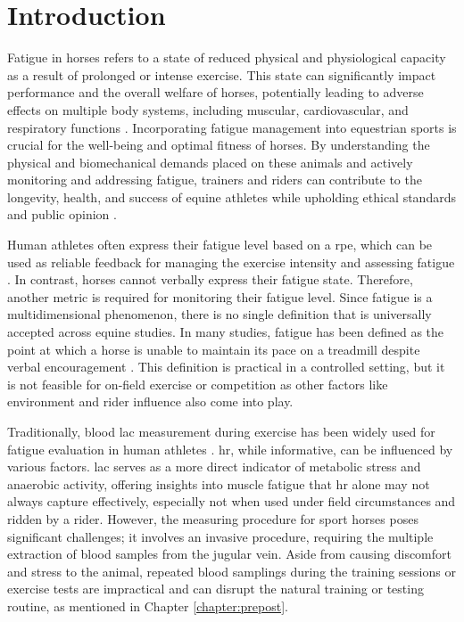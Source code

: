 \section{Introduction}
\label{sec:fatigue_introduction}

Fatigue in horses refers to a state of reduced physical and physiological capacity as a result of prolonged or intense exercise. This state can significantly impact performance and the overall welfare of horses, potentially leading to adverse effects on multiple body systems, including muscular, cardiovascular, and respiratory functions \cite{Taylor2008-mp}. Incorporating fatigue management into equestrian sports is crucial for the well-being and optimal fitness of horses. By understanding the physical and biomechanical demands placed on these animals and actively monitoring and addressing fatigue, trainers and riders can contribute to the longevity, health, and success of equine athletes while upholding ethical standards and public opinion \cite{Arfuso2021PeripheralHorses,Rivero2001CoordinatedTraining.}. 

Human athletes often express their fatigue level based on a \gls{rpe}, which can be used as reliable feedback for managing the exercise intensity and assessing fatigue \cite{carrie}. In contrast, horses cannot verbally express their fatigue state. Therefore, another metric is required for monitoring their fatigue level. Since fatigue is a multidimensional phenomenon, there is no single definition that is universally accepted across equine studies. In many studies, fatigue has been defined as the point at which a horse is unable to maintain its pace on a treadmill despite verbal encouragement \cite{Bowers1999InfluenceRacehorses.}. This definition is practical in a controlled setting, but it is not feasible for on-field exercise or competition as other factors like environment and rider influence also come into play.

Traditionally, blood \gls{lac} measurement during exercise has been widely used for fatigue evaluation in human athletes \cite{Theofilidis2018-yz,Ishii2013-mp}. \gls{hr}, while informative, can be influenced by various factors. \gls{lac} serves as a more direct indicator of metabolic stress and anaerobic activity, offering insights into muscle fatigue that \gls{hr} alone may not always capture effectively, especially not when used under field circumstances and ridden by a rider. However, the measuring procedure for sport horses poses significant challenges; it involves an invasive procedure, requiring the multiple extraction of blood samples from the jugular vein. Aside from causing discomfort and stress to the animal, repeated blood samplings during the training sessions or exercise tests are impractical and can disrupt the natural training or testing routine, as mentioned in Chapter \ref{chapter:prepost}. 

